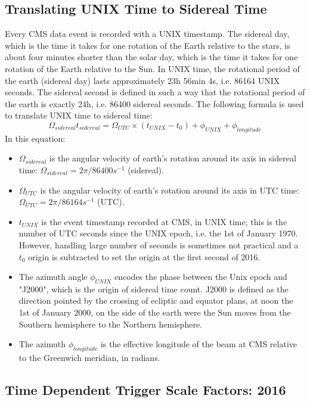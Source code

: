 {\subsection{Translating UNIX Time to Sidereal Time}
Every CMS data event is recorded with a UNIX timestamp. 
The sidereal day, which is the time it takes for one rotation of the Earth relative to the stars, is about four minutes shorter than the solar day, which is the time it takes for one rotation of the Earth relative to the Sun.
In UNIX time, the rotational period of the earth (sidereal day) lasts approximately 23h 56min 4s, i.e. 86164 UNIX seconds. 
The sidereal second is defined in such a way that the rotational period of the earth is exactly 24h, i.e. 86400 sidereal seconds.
The following formula is used to translate UNIX time to sidereal time:
\begin{equation}
\Omega_{sidereal} t_{sidereal} = \Omega_{UTC} \times (t_{UNIX} - t_0) + \phi_{UNIX} + \phi_{longitude}
\end{equation}
In this equation:
\begin{itemize}
\item $\Omega_{sidereal}$ is the angular velocity of earth's rotation around its axis in sidereal time: $\Omega_{sidereal} = 2\pi / 86400 s^{-1}$ (sidereal). 
\item $\Omega_{UTC}$ is the angular velocity of earth's rotation around its axis in UTC time: $\Omega_{UTC} = 2\pi / 86164 s^{-1}$ (UTC). 
\item $t_{UNIX}$ is the event timestamp recorded at CMS, in UNIX time; this is the number of UTC seconds since the UNIX epoch, i.e. the 1st of January 1970. However, handling large number of seconds is sometimes not practical and a $t_0$ origin is subtracted to set the origin at the first second of 2016.
\item The azimuth angle $\phi_{UNIX}$ encodes the phase between the Unix epoch and "J2000", which is the origin of sidereal time count. J2000 is defined as the direction pointed by the crossing of ecliptic and equator plans, at noon the 1st of January 2000, on the side of the earth were the Sun moves from the Southern hemisphere to the Northern hemisphere. 
\item The azimuth $\phi_{longitude}$ is the effective longitude of the beam at CMS relative to the Greenwich meridian, in radians.
\end{itemize}

\clearpage
\newpage
\subsection{Time Dependent Trigger Scale Factors: 2016}
\label{TrigSFResults_SideReal_2016}

}

